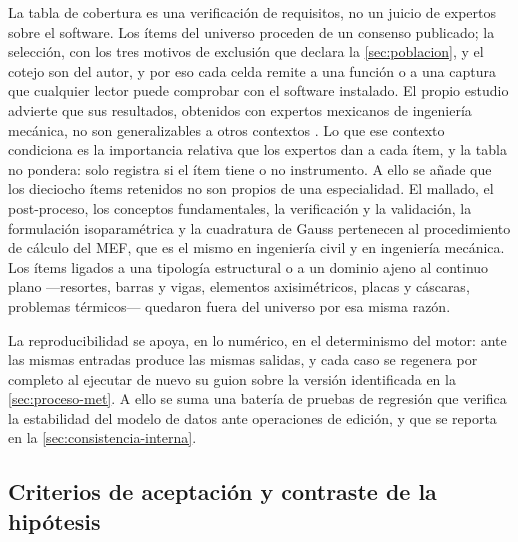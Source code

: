 La tabla de cobertura es una verificación de requisitos, no un juicio de expertos sobre el software. Los ítems del universo proceden de un consenso publicado; la selección, con los tres motivos de exclusión que declara la \autoref{sec:poblacion}, y el cotejo son del autor, y por eso cada celda remite a una función o a una captura que cualquier lector puede comprobar con el software instalado. El propio estudio advierte que sus resultados, obtenidos con expertos mexicanos de ingeniería mecánica, no son generalizables a otros contextos \autocite[p.~1171]{perezsantiago2023fem}. Lo que ese contexto condiciona es la importancia relativa que los expertos dan a cada ítem, y la tabla no pondera: solo registra si el ítem tiene o no instrumento. A ello se añade que los dieciocho ítems retenidos no son propios de una especialidad. El mallado, el post-proceso, los conceptos fundamentales, la verificación y la validación, la formulación isoparamétrica y la cuadratura de Gauss pertenecen al procedimiento de cálculo del MEF, que es el mismo en ingeniería civil y en ingeniería mecánica. Los ítems ligados a una tipología estructural o a un dominio ajeno al continuo plano —resortes, barras y vigas, elementos axisimétricos, placas y cáscaras, problemas térmicos— quedaron fuera del universo por esa misma razón.

La reproducibilidad se apoya, en lo numérico, en el determinismo del motor: ante las mismas entradas produce las mismas salidas, y cada caso se regenera por completo al ejecutar de nuevo su guion sobre la versión identificada en la \autoref{sec:proceso-met}. A ello se suma una batería de pruebas de regresión que verifica la estabilidad del modelo de datos ante operaciones de edición, y que se reporta en la \autoref{sec:consistencia-interna}.

\subsection{Criterios de aceptación y contraste de la hipótesis}
\label{sec:validacion-resultados}

